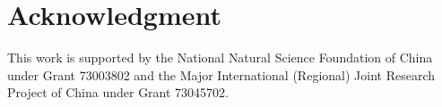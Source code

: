 \documentclass[conference,compsoc]{IEEEtran}
\begin{document}
  \section*{Acknowledgment}
\fi

This work is supported by the National Natural Science Foundation of China under Grant 73003802 and the Major International (Regional) Joint Research Project of China under Grant 73045702.



%
%
%
%
%



%

\end{document}
